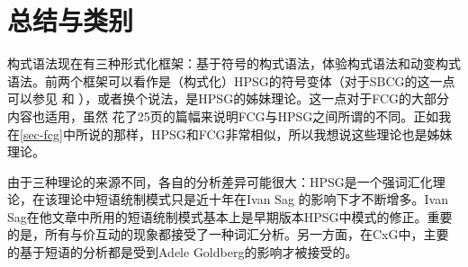 \section{总结与类别}

\begin{sloppypar}
构式语法现在有三种形式化框架：基于符号的构式语法，体验构式语法和动变构式语法。前两个框架可以看作是（构式化）HPSG\indexhpsg  的符号变体（对于SBCG的这一点可以参见 和 ），或者换个说法，是HPSG的姊妹理论。这一点对于FCG的大部分内容也适用，虽然 \citet{vanTrijp2013a}花了25页的篇幅来说明FCG与HPSG之间所谓的不同。正如我在\ref{sec-fcg}中所说的那样，HPSG和FCG非常相似，所以我想说这些理论也是姊妹理论。
\end{sloppypar}

由于三种理论的来源不同，各自的分析差异可能很大：HPSG是一个强词汇化理论，在该理论中短语统制模式只是近十年在Ivan Sag 的影响下才不断增多。Ivan Sag在他文章中所用的短语统制模式基本上是早期版本HPSG中模式的修正。重要的是，所有与价互动的现象都接受了一种词汇分析\citep*[\S~2.3]{SBK2012a}。另一方面，在CxG中，主要的基于短语的分析都是受到Adele Goldberg的影响才被接受的。

